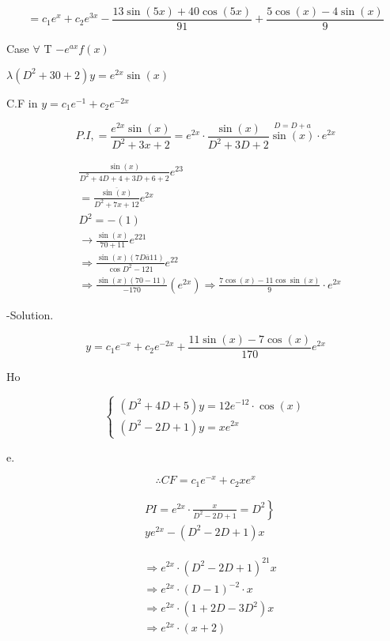\documentclass[12pt, a4paper]{article}
\begin{document}
$$
=c_{1} e^{x}+c_{2} e^{3 x}-\frac{13 \sin (5 x)+40 \cos (5 x)}{91}+\frac{5 \cos (x)-4 \sin (x)}{9}
$$

Case $\forall$ T $-e^{a x} f(x)$

$\lambda\left(D^{2}+30+2\right) y=e^{2 x} \sin (x)$

C.F in $y=c_{1} e^{-1}+c_{2} e^{-2 x}$

$$
P . I,=\frac{e^{2 x} \sin (x)}{D^{2}+3 x+2}=e^{2 x} \cdot \frac{\sin (x)}{D^{2}+3 D+2} \stackrel{D=D+a}{\sin (x)} \cdot e^{2 x}
$$

$$
\begin{aligned}
& \frac{\sin (x)}{D^{2}+4 D+4+3 D+6+2} e^{23} \\
& =\frac{\overline{\sin (x)}}{D^{2}+7 x+12} e^{2 x} \\
& D^{2}=-(1) \\
& \rightarrow \frac{\sin (x)}{70+11} e^{221} \\
& \Rightarrow \frac{\sin (x)(7 D \bar{a} 11)}{\cos D^{2}-121} e^{22} \\
& \Rightarrow \frac{\sin (x)(70-11)}{-170}\left(e^{2 x}\right) \Rightarrow \frac{7 \cos (x)-11 \cos \sin (x)}{9} \cdot e^{2 x}
\end{aligned}
$$

-Solution.

$$
y=c_{1} e^{-x}+c_{2} e^{-2 x}+\frac{11 \sin (x)-7 \cos (x)}{170} e^{2 x}
$$

Ho

$$
\left\{\begin{array}{l}
\left(D^{2}+4 D+5\right) y=12 e^{-12} \cdot \cos (x) \\
\left(D^{2}-2 D+1\right) y=x e^{2 x}
\end{array}\right.
$$

e.

$$
\therefore C F=c_{1} e^{-x}+c_{2} x e^{x}
$$

$$
\begin{aligned}
& \left.P I=e^{2 x} \cdot \frac{x}{D^{2}-2 D+1}=D^{2}\right\} \\
& y e^{2 x}-\left(D^{2}-2 D+1\right) x
\end{aligned}
$$

$$
\begin{aligned}
& \Rightarrow e^{2 x} \cdot\left(D^{2}-2 D+1\right)^{21} x \\
& \Rightarrow e^{2 x} \cdot(D-1)^{-2} \cdot x \\
& \Rightarrow e^{2 x} \cdot\left(1+2 D-3 D^{2}\right) x \\
& \Rightarrow e^{2 x} \cdot(x+2)
\end{aligned}
$$
\end{document}
